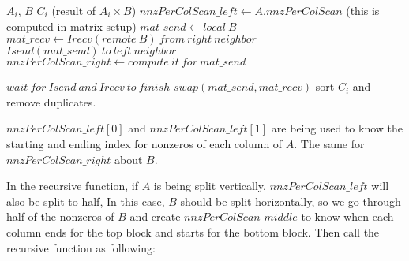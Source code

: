 \documentclass{article}
\newcommand{\recmm}{\textsc{recurs\_matmult}}
\begin{document}


\begin{algorithm}[H] 
  \caption{$C_i = A_i \times B$} \label{alg:part1} 
  \begin{algorithmic}[1]
    \Require $A_i$, $B$
    \Ensure  $C_i$ (result of $A_i \times B$)
    \State $nnzPerColScan\_left \gets A.nnzPerColScan$ (this is computed in matrix setup)
    \State $mat\_send \gets local\ B$
      \State $mat\_recv \gets Irecv(remote\ B)\ from\ right\ neighbor$
      \State $Isend(mat\_send)\ to\ left\ neighbor$
      \State $nnzPerColScan\_right \gets compute\ it\ for\ mat\_send$
      \State {}

      \State $wait\ for\ Isend\ and\ Irecv\ to\ finish$
      \State $swap(mat\_send,mat\_recv)$
    \EndFor
    \State sort $C_i$ and remove duplicates.
  \end{algorithmic}
\end{algorithm}

$nnzPerColScan\_left[0]$ and $nnzPerColScan\_left[1]$ are being used to know the starting and ending index for nonzeros of each column of $A$. The same for $nnzPerColScan\_right$ about $B$.

In the recursive function, if $A$ is being split vertically, $nnzPerColScan\_left$  will also be split to half, In this case, $B$ should be split horizontally, so we go through half of the nonzeros of $B$ and create $nnzPerColScan\_middle$ to know when each column ends for the top block and starts for the bottom block. Then call the recursive function as following:
\end{document}
